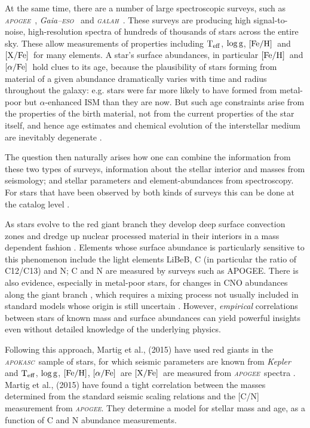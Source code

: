 \documentclass[12pt, preprint]{aastex}
\newcommand{\project}[1]{\textsl{#1}}
\newcommand{\apogee}{\project{\textsc{apogee}}}
\newcommand{\apokasc}{\project{\textsc{apokasc}}}
\newcommand{\kepler}{\project{Kepler}}
\newcommand{\gaiaeso}{\project{Gaia--\textsc{eso}}}
\newcommand{\galah}{\project{\textsc{galah}}}
\newcommand{\teff}{\mbox{$\rm T_{eff}$}}
\newcommand{\feh}{\mbox{$\rm [Fe/H]$}}
\newcommand{\xfe}{\mbox{$\rm [X/Fe]$}}
\newcommand{\alphafe}{\mbox{$\rm [\alpha/Fe]$}}
\newcommand{\logg}{\mbox{$\rm \log g$}}
\begin{document}
At the same time, there are a number of large spectroscopic surveys, such
as \apogee\ \citep{Majewski2012}, \gaiaeso\ \citep{Gilmore2012} and \galah\ \citep{Freeman2012}. These surveys are 
producing high signal-to-noise, high-resolution spectra
of hundreds of thousands of stars across the entire sky. These allow measurements of properties including \teff, \logg, \feh\ and \xfe\ for many elements. A star's surface abundances, in particular \feh\ and \alphafe\ hold clues to its age, because the plausibility of stars forming from material of a given abundance dramatically varies with time and radius throughout the galaxy: e.g. stars 
were far more likely to have formed from metal-poor but $\alpha$-enhanced ISM than they are now. But such age constraints arise from the properties of the birth material, not from the current properties of the star itself, and hence age estimates and chemical evolution of the interstellar medium are inevitably degenerate \citep[see e.g.,][]{Schonrich2009, Ch2002}.

The question then naturally arises how one can combine the information from these two types of surveys, information about the stellar interior and masses from seismology; and
stellar parameters and element-abundances from spectroscopy. For stars that have been observed by both kinds of surveys this can be done at the catalog level \citep{Martig2014}.

As stars evolve to the red giant branch they develop deep surface convection zones and dredge up nuclear processed material in their interiors in a mass dependent fashion \citep{Iben1967}.  Elements whose surface abundance is particularly sensitive to this phenomenon include the light elements LiBeB, C (in particular the ratio of C12/C13) and N; C and N are measured by surveys such as APOGEE.  There is also evidence, especially in metal-poor stars, for changes in CNO abundances along the giant branch \citep{Kraft1994}, which requires a mixing process not usually included in standard models whose origin is still uncertain \citep{A2012}.  However, \textit{empirical} correlations between stars of known mass and surface abundances can yield powerful insights even without detailed knowledge of the underlying physics.

Following this approach, Martig et al., (2015) have used red giants in the \apokasc\ sample of stars, for which seismic parameters are known from \kepler\ \citep{P2014} and \teff, \logg, \feh, \alphafe\  are \xfe\ are measured from \apogee\ spectra \citep{Ahn2014}. Martig et al., (2015) have found a tight correlation between the masses determined from the standard seismic scaling relations and the [C/N] measurement from \apogee.  They determine a model for stellar mass and age, as a function of C and N abundance measurements. 
\end{document}

